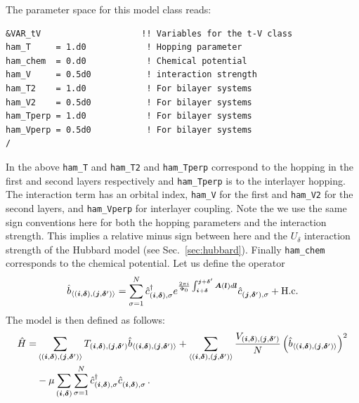 
The parameter space for this model class  reads: 

\begin{lstlisting}[style=fortran,escapechar=\#,breaklines=true]
&VAR_tV                    !! Variables for the t-V class
ham_T     = 1.d0            ! Hopping parameter
ham_chem  = 0.d0            ! Chemical potential
ham_V     = 0.5d0           ! interaction strength
ham_T2    = 1.d0            ! For bilayer systems
ham_V2    = 0.5d0           ! For bilayer systems
ham_Tperp = 1.d0            ! For bilayer systems
ham_Vperp = 0.5d0           ! For bilayer systems
/

\end{lstlisting}
In the above   \texttt{ham\_T} and \texttt{ham\_T2} and \texttt{ham\_Tperp}   correspond to the hopping in the first and second layers respectively and  \texttt{ham\_Tperp}   is to the interlayer hopping.   The interaction term has an orbital index, 
\texttt{ham\_V}  for the first and  \texttt{ham\_V2}  for the second layers,  and \texttt{ham\_Vperp} for interlayer coupling. Note the we use the same sign conventions here for both the hopping parameters and the interaction strength. This implies a relative minus sign between here and the $U_\delta$ interaction strength of the Hubbard model (see Sec.~\ref{sec:hubbard}).
Finally   \texttt{ham\_chem}  corresponds to the chemical potential. Let us define the operator
\begin{equation}
\hat{b}_{\langle (\boldsymbol{i},\boldsymbol{\delta}), (\boldsymbol{j},\boldsymbol{\delta}') \rangle} =  \sum_{\sigma =1}^{N}    \hat{c}^{\dagger}_{(\boldsymbol{i},\boldsymbol{\delta}), \sigma }   e^{\frac{2 \pi i}{\Phi_0} \int_{\boldsymbol{i} + \boldsymbol{\delta}}^{\boldsymbol{j} + \boldsymbol{\delta}'}  
	\boldsymbol{A}(\boldsymbol{l})  d \boldsymbol{l}} \hat{c}^{}_{(\boldsymbol{j},\boldsymbol{\delta}'),\sigma} 
+ \textrm{H.c.}
\end{equation}
The model is then defined as follows:
\begin{align}
\hat{H}= & \sum_{\langle (\ve{i},\ve{\delta}), (\ve{j},\ve{\delta}') \rangle}   T_{(\ve{i},\ve{\delta}), (\ve{j},\ve{\delta}')}    \hat{b}_{\langle (\ve{i},\ve{\delta}), (\ve{j},\ve{\delta}') \rangle}
+ \sum_{\langle (\ve{i},\ve{\delta}), (\ve{j},\ve{\delta}') \rangle}  \frac{V_{(\ve{i},\ve{\delta}), (\ve{j},\ve{\delta}')}}{N} \left(  \hat{b}_{\langle (\ve{i},\ve{\delta}), (\ve{j},\ve{\delta}') \rangle}  \right)^2  \nonumber \\
& - \mu \sum_{(\ve{i},\ve{\delta})}  \sum_{\sigma =1}^{N} \hat{c}^{\dagger}_{(\vec{i},\ve{\delta}),\sigma } \hat{c}^{\phantom\dagger}_{(\vec{i},\ve{\delta}),\sigma } \,.
\end{align}
